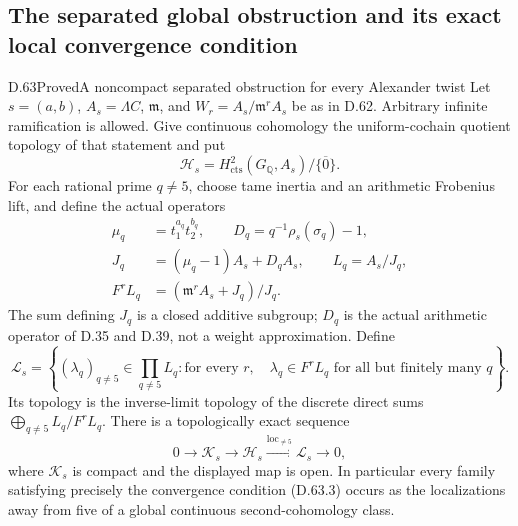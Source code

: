 \subsection{The separated global obstruction and its exact local convergence condition}

\begin{statement}{D.63}{Proved}{A noncompact separated obstruction for every Alexander twist}
Let \(s=(a,b)\), \(A_s=\Lambda C\), \(\mathfrak m\), and
\(W_r=A_s/\mathfrak m^rA_s\) be as in D.62. Arbitrary
infinite ramification is allowed. Give continuous cohomology
the uniform-cochain quotient topology of that statement and put
\[
 \mathcal H_s=H^2_{\mathrm{cts}}(G_{\mathbb Q},A_s)/
                                      \overline{\{0\}}.
                                                        \tag{D.63.1}
\]
For each rational prime \(q\ne5\), choose tame inertia and
an arithmetic Frobenius lift, and define the actual operators
\[
 \begin{split}
 \mu_q&=t_1^{a_q}t_2^{b_q},\qquad
 D_q=q^{-1}\rho_s(\sigma_q)-1,\\
 J_q&=(\mu_q-1)A_s+D_qA_s,\qquad L_q=A_s/J_q,\\
 F^rL_q&=(\mathfrak m^rA_s+J_q)/J_q.
 \end{split}                                             \tag{D.63.2}
\]
The sum defining \(J_q\) is a closed additive subgroup;
\(D_q\) is the actual arithmetic operator of D.35 and D.39,
not a weight approximation. Define
\[
 \mathcal L_s=\left\{(\lambda_q)_{q\ne5}\in\prod_{q\ne5}L_q:
  \text{for every }r,\quad
  \lambda_q\in F^rL_q\text{ for all but finitely many }q\right\}.
                                                        \tag{D.63.3}
\]
Its topology is the inverse-limit topology of the discrete
direct sums \(\bigoplus_{q\ne5}L_q/F^rL_q\).
There is a topologically exact sequence
\[
 0\longrightarrow\mathcal K_s\longrightarrow\mathcal H_s
       \xrightarrow{\mathrm{loc}_{\ne5}}\mathcal L_s
       \longrightarrow0,                               \tag{D.63.4}
\]
where \(\mathcal K_s\) is compact and the displayed map is
open. In particular every family satisfying precisely the
convergence condition (D.63.3) occurs as the localizations
away from five of a global continuous second-cohomology
class.


\end{statement}
